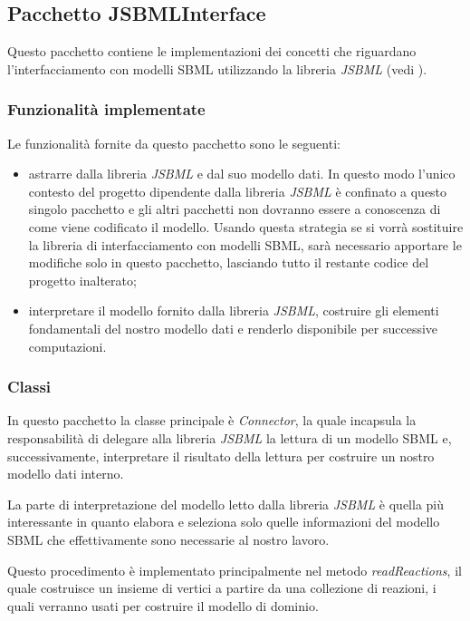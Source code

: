 \subsection{Pacchetto JSBMLInterface}
\label{subsection:JSbmlInterface-package-description}
Questo pacchetto contiene le implementazioni dei concetti che
riguardano l'interfacciamento con modelli SBML utilizzando la libreria
\emph{JSBML} (vedi \cite{JSbmlDistribution}).

\subsubsection*{Funzionalit\`a implementate}

Le funzionalit\`a fornite da questo pacchetto sono le seguenti:
\begin{itemize}
\item astrarre dalla libreria \emph{JSBML} e dal suo modello dati. In
  questo modo l'unico contesto del progetto dipendente dalla libreria
  \emph{JSBML} \`e confinato a questo singolo pacchetto e gli altri
  pacchetti non dovranno essere a conoscenza di come viene codificato
  il modello. Usando questa strategia se si vorr\`a sostituire la
  libreria di interfacciamento con modelli SBML, sar\`a necessario
  apportare le modifiche solo in questo pacchetto, lasciando tutto il
  restante codice del progetto inalterato;
\item interpretare il modello fornito dalla libreria \emph{JSBML},
  costruire gli elementi fondamentali del nostro modello dati e
  renderlo disponibile per successive computazioni.
\end{itemize}

\subsubsection*{Classi}
In questo pacchetto la classe principale \`e \emph{Connector}, la
quale incapsula la responsabilit\`a di delegare alla libreria
\emph{JSBML} la lettura di un modello SBML e, successivamente,
interpretare il risultato della lettura per costruire un nostro
modello dati interno.

La parte di interpretazione del modello letto dalla libreria
\emph{JSBML} \`e quella pi\`u interessante in quanto elabora e
seleziona solo quelle informazioni del modello SBML che effettivamente
sono necessarie al nostro lavoro.

Questo procedimento \`e implementato principalmente nel metodo
\emph{readReactions}, il quale costruisce un insieme di vertici a
partire da una collezione di reazioni, i quali verranno usati per
costruire il modello di dominio.

